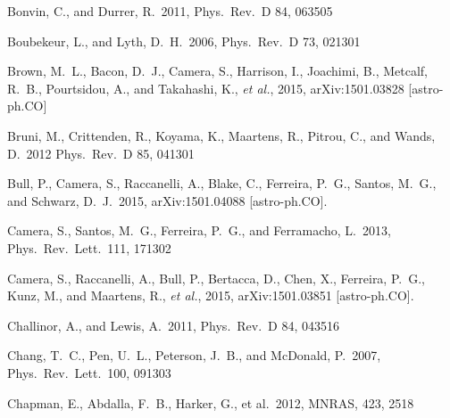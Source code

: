 \begin{thebibliography}{99}
\begin{multicols}{2}
{ 
  Bonvin, C., and Durrer, R.\ 2011,
  Phys.\ Rev.\ D 84, 063505

  Boubekeur, L., and Lyth, D.~H.\ 2006,
  Phys.\ Rev.\ D 73, 021301

  Brown, M.~L., Bacon, D.~J., Camera, S., Harrison, I., Joachimi, B., Metcalf, R.~B., Pourtsidou, A., and Takahashi, K., {\it et al.}, 2015, 
  arXiv:1501.03828 [astro-ph.CO]

  Bruni, M., Crittenden, R., Koyama, K., Maartens, R., Pitrou, C., and Wands, D.\ 2012
  Phys.\ Rev.\ D 85, 041301

  Bull, P., Camera, S., Raccanelli, A., Blake, C., Ferreira, P.~G., Santos, M.~G., and Schwarz, D.~J.\ 2015,
  arXiv:1501.04088 [astro-ph.CO].


  Camera, S., Santos, M.~G., Ferreira, P.~G., and Ferramacho, L.\ 2013,
  Phys.\ Rev.\ Lett.\  111, 171302
  
  Camera, S., Raccanelli, A., Bull, P., Bertacca, D., Chen, X., Ferreira, P.~G., Kunz, M., and Maartens, R., {\it et al.}, 2015,
  arXiv:1501.03851 [astro-ph.CO].

  Challinor, A., and Lewis, A.\ 2011,
  Phys.\ Rev.\ D 84, 043516

  Chang, T.~C., Pen, U.~L., Peterson, J.~B., and McDonald, P.\ 2007,
  Phys.\ Rev.\ Lett.\ 100, 091303

 Chapman, E., Abdalla, 
F.~B., Harker, G., et al.\ 2012, MNRAS, 423, 2518

}
\end{multicols}
\end{thebibliography}
